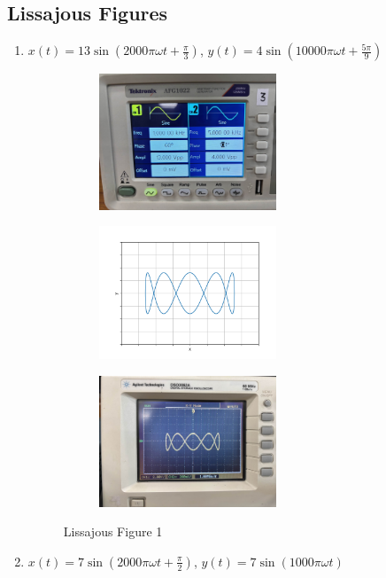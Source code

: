 \documentclass[a4paper,12pt]{article}
\begin{document}
\subsection*{Lissajous Figures}
\begin{enumerate}
	\item $x(t) = 13\sin(2000\pi\omega t + \frac{\pi}{3})$, $y(t) = 4\sin(10000\pi\omega t + \frac{5\pi}{9})$\\
\begin{figure}[h!]
	\begin{subfigure}[b]{10pt}
		\includegraphics[width = 150pt]{figs/fig1.jpeg}
	\end{subfigure}
	\hspace{135pt}
	\begin{subfigure}[b]{10pt}
		\includegraphics[width = 150pt]{figs/fig1.png}
	\end{subfigure}
	\hspace{135pt}
	\begin{subfigure}[b]{10pt}
		\includegraphics[width = 150pt]{figs/fig1_1.jpeg}
	\end{subfigure}
	\caption{Lissajous Figure 1}
\end{figure}
\pagebreak
	\item $x(t) = 7\sin(2000\pi\omega t + \frac{\pi}{2})$, $y(t) = 7\sin(1000\pi\omega t)$\\

\end{enumerate}
\end{document}
